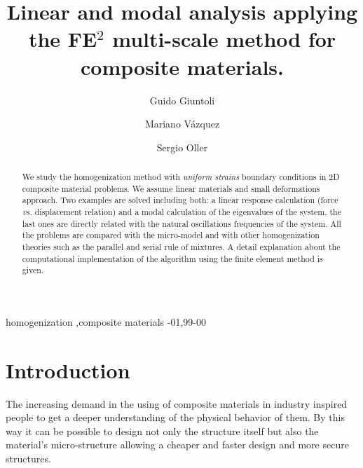 \documentclass[3p]{elsarticle}
\begin{document}
\begin{frontmatter}

\title{Linear and modal analysis applying the FE$^2$ multi-scale method for composite materials.}

\author[bsc]{Guido Giuntoli}
\author[bsc]{Mariano V\'azquez}
\author[upc]{Sergio Oller}
\address[bsc]{Barcelona Supercomputing Center, Barcelona, Spain}
\address[upc]{Universitat Polit\`ecnica de Catalunya, Barcelona, Spain}


\begin{abstract}
We study the homogenization method with \emph{uniform strains} boundary
conditions in 2D composite material problems.
We assume linear materials and small deformations approach.
Two examples are solved including both: a linear response calculation (force
\emph{vs.} displacement relation) and a modal calculation of the eigenvalues 
of the system, the last ones are directly related with the natural oscillations 
frequencies of the system.
All the problems are compared with the micro-model and with other homogenization 
theories such as the parallel and serial rule of mixtures.
A detail explanation about the computational implementation of the algorithm using 
the finite element method is given.
\end{abstract}

\begin{keyword}
homogenization \sep composite materials 
-01\sep  99-00
\end{keyword}
 
\end{frontmatter}


\section{Introduction}

The increasing demand in the using of composite materials in industry inspired people
to get a deeper understanding of the physical behavior of them. By this way it
can be possible to design not only the structure itself but also the material's
micro-structure allowing a cheaper and faster design and more secure structures.
\end{document}
